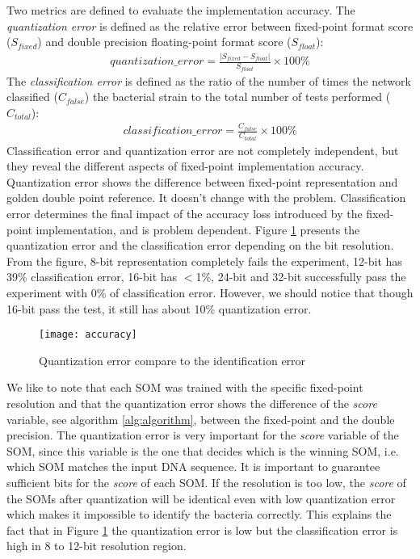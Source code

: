 Two metrics are defined to evaluate the implementation accuracy. The \emph{quantization error} is defined as the relative error between fixed-point format score ($S_{fixed}$) and double precision floating-point format score ($S_{float}$):
\begin{align*}
	quantization\_error = \frac{|S_{fixed} - S_{float}|}{S_{float}}\times 100\%
\end{align*}
The \emph{classification error} is defined as the ratio of the number of times the network classified ($C_{false}$) the bacterial strain to the total number of tests performed ($C_{total}$):
\begin{align*}
	classification\_error = \frac{C_{false}}{C_{total}}\times 100\%
\end{align*}
Classification error and quantization error are not completely independent, but they reveal the different aspects of fixed-point implementation accuracy. Quantization error shows the difference between fixed-point representation and golden double point reference. It doesn't change with the problem. Classification error determines the final impact of the accuracy loss introduced by the fixed-point implementation, and is problem dependent. Figure \ref{fig:error} presents the quantization error and the classification error depending on the bit resolution. From the figure, 8-bit representation completely fails the experiment, 12-bit has 39\% classification error, 16-bit has $<$1\%, 24-bit and 32-bit successfully pass the experiment with 0\% of classification error. However, we should notice that though 16-bit pass the test, it still has about 10\% quantization error.\par
\begin{figure}[ht]
	\centering
	\texttt{[image: accuracy]}
	\caption{Quantization error compare to the identification error}
	\label{fig:error}
\end{figure}
We like to note that each SOM was trained with the specific fixed-point resolution and that the quantization error shows the difference of the \emph{score} variable, see algorithm \ref{alg:algorithm}, between the fixed-point and the double precision. The quantization error is very important for the \emph{score} variable of the SOM, since this variable is the one that decides which is the winning SOM, i.e. which SOM matches the input DNA sequence. It is important to guarantee sufficient bits for the \emph{score} of each SOM. If the resolution is too low, the \emph{score} of the SOMs after quantization will be identical even with low quantization error which makes it impossible to identify the bacteria correctly. This explains the fact that in Figure \ref{fig:error} the quantization error is low but the classification error is high in 8 to 12-bit resolution region.
